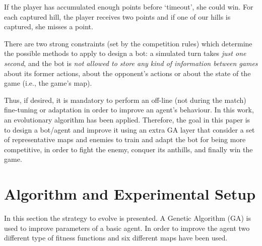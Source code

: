 \documentclass[runningheads]{llncs}
\begin{document}
If the player has accumulated enough points before `timeout', she could win. For each captured hill, the player receives two points and if one of our hills is captured, she misses a point.



There are two strong constraints (set by the competition rules) which determine the possible methods to apply to design a bot: a simulated turn takes \textit{just one second}, and the bot is \textit{not allowed to store any kind of information between games} about its former actions, about the opponent's actions or about the state of the game (i.e., the game's map). 

Thus, if desired, it is mandatory to  perform an off-line (not during the match) fine-tuning or adaptation in order to improve an agent's behaviour. In this work, an evolutionary algorithm has been applied. 
Therefore, the goal in this paper is to design a bot/agent and improve it using an extra GA layer that consider a set of representative maps and enemies to train and adapt the bot for being more competitive, in order to fight the enemy, conquer its anthills, and finally win the game. 




\section{Algorithm and Experimental Setup}

In this section the strategy to evolve is presented. A Genetic Algorithm (GA) is used to improve parameters of a basic agent.  In order to improve the agent two different type of fitness functions and six different maps have been used. 
\end{document}
